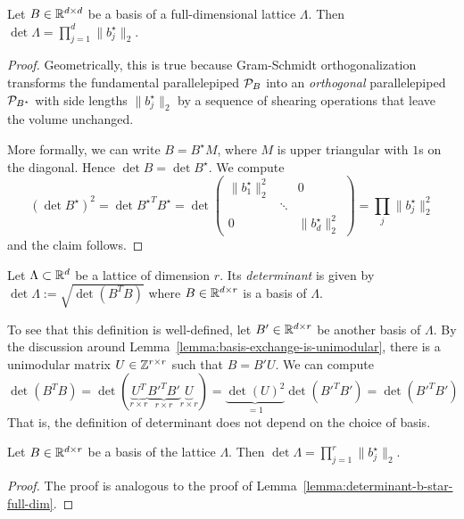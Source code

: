 \begin{lemma}
  \label{lemma:determinant-b-star-full-dim}
  Let $B \in \mathbb{R}^{d \times d}$ be a basis of a full-dimensional lattice $\Lambda$.
  Then $\det \Lambda = \prod_{j=1}^d \|b_j^\star\|_2$.
\end{lemma}
\begin{proof}
  Geometrically, this is true because Gram-Schmidt orthogonalization transforms
  the fundamental parallelepiped $\mathcal{P}_B$ into an \emph{orthogonal} parallelepiped $\mathcal{P}_{B^\star}$
  with side lengths $\|b_j^\star\|_2$
  by a sequence of shearing operations that leave the volume unchanged.

  More formally, we can write $B = B^\star M$, where $M$ is upper triangular with $1$s on the diagonal.
  Hence $\det B = \det B^\star$. We compute
  \[
    (\det B^\star)^2 = \det {B^\star}^T B^\star = \det \begin{pmatrix}
        \|b_1^\star\|_2^2 &        & 0 \\
                          & \ddots &   \\
        0                 &        & \|b_d^\star\|_2^2
      \end{pmatrix} = \prod_j \|b_j^\star\|_2^2
  \]
  and the claim follows.
\end{proof}

\begin{definition}
  Let $\Lambda \subset \mathbb{R}^d$ be a lattice of dimension $r$.
  Its \emph{determinant} is given by $\det\Lambda := \sqrt{\det(B^TB)}$
  where $B \in \mathbb{R}^{d \times r}$ is a basis of $\Lambda$.
\end{definition}

To see that this definition is well-defined, let $B' \in \mathbb{R}^{d \times r}$ be another basis of $\Lambda$.
By the discussion around Lemma~\ref{lemma:basis-exchange-is-unimodular},
there is a unimodular matrix $U \in \mathbb{Z}^{r \times r}$ such that $B = B'U$.
We can compute
\[
  \det(B^T B) = \det(\underbrace{U^T}_{r \times r} \underbrace{{B'}^T B'}_{r \times r} \underbrace{U}_{r \times r})
    = \underbrace{\det(U)^2}_{=1} \det({B'}^T B') = \det({B'}^T B')
\]
That is, the definition of determinant does not depend on the choice of basis.

\begin{lemma}
  \label{lemma:determinant-b-star}
  Let $B \in \mathbb{R}^{d \times r}$ be a basis of the lattice $\Lambda$.
  Then $\det \Lambda = \prod_{j=1}^r \|b_j^\star\|_2$.
\end{lemma}
\begin{proof}
  The proof is analogous to the proof of Lemma~\ref{lemma:determinant-b-star-full-dim}.
\end{proof}

